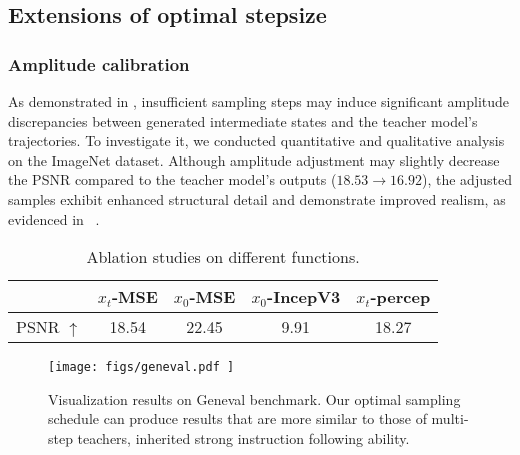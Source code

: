 \documentclass[10pt,twocolumn,letterpaper]{article}
\begin{document}
    \subsection{Extensions of optimal stepsize}
    \subsubsection{Amplitude calibration} \label{sec:amplitude}
    As demonstrated in , insufficient sampling steps may induce significant amplitude discrepancies between generated intermediate states and the teacher model's trajectories. To investigate it, we conducted quantitative and qualitative analysis on the ImageNet dataset. Although amplitude adjustment may slightly decrease the PSNR compared to the teacher model's outputs ($18.53 \rightarrow 16.92$), the adjusted samples exhibit enhanced structural detail and demonstrate improved realism, as evidenced in ~.

   
\begin{table}[H]

    \centering
    \begin{tabular}{ccccc} 
    \toprule
                                       & \textcolor[rgb]{0.2,0.2,0.2}{$x_t$-MSE}                                & \textcolor[rgb]{0.2,0.2,0.2}{$x_0$-MSE} & \textcolor[rgb]{0.2,0.2,0.2}{$x_0$-IncepV3} & \textcolor[rgb]{0.2,0.2,0.2}{$x_t$-percep}\textcolor[rgb]{0.2,0.2,0.2}{}  \\ 
    \hline
    \textcolor[rgb]{0.2,0.2,0.2}{PSNR $\uparrow$} & \textcolor[rgb]{0.2,0.2,0.2}{18.5}\textcolor[rgb]{0.2,0.2,0.2}{4} & \textcolor[rgb]{0.2,0.2,0.2}{22.45}                                       & \textcolor[rgb]{0.2,0.2,0.2}{9.91}                                          & \textcolor[rgb]{0.2,0.2,0.2}{18.27}                                           \\
    \bottomrule
    \end{tabular}
    \vspace{-0.3cm}
    \caption{Ablation studies on different functions.}
    \label{table:metrics}
    \end{table}



    \begin{figure*}[t]
        \centering
        \vspace{-0.6cm}
        \texttt{[image: 
            figs/geneval.pdf
        ]}
        \vspace{-0.8cm}
        \caption{Visualization results on Geneval benchmark. Our optimal sampling schedule can produce results that are more similar to those of multi-step teachers, inherited strong instruction following ability.} 
        \label{fig:geneval}
    \end{figure*}
\end{document}
